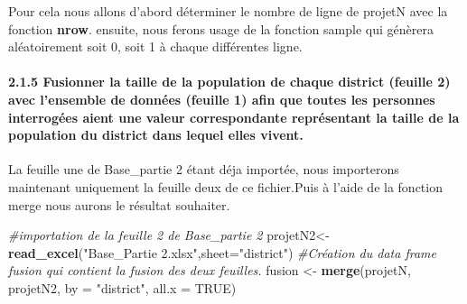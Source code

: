 \documentclass[
]{article}
\newenvironment{Shaded}{\begin{snugshade}}{\end{snugshade}}
\newcommand{\AttributeTok}[1]{\textcolor[rgb]{0.13,0.29,0.53}{#1}}
\newcommand{\CommentTok}[1]{\textcolor[rgb]{0.56,0.35,0.01}{\textit{#1}}}
\newcommand{\ConstantTok}[1]{\textcolor[rgb]{0.56,0.35,0.01}{#1}}
\newcommand{\DecValTok}[1]{\textcolor[rgb]{0.00,0.00,0.81}{#1}}
\newcommand{\FunctionTok}[1]{\textcolor[rgb]{0.13,0.29,0.53}{\textbf{#1}}}
\newcommand{\NormalTok}[1]{#1}
\newcommand{\OtherTok}[1]{\textcolor[rgb]{0.56,0.35,0.01}{#1}}
\newcommand{\SpecialCharTok}[1]{\textcolor[rgb]{0.81,0.36,0.00}{\textbf{#1}}}
\newcommand{\StringTok}[1]{\textcolor[rgb]{0.31,0.60,0.02}{#1}}
\begin{document}
Pour cela nous allons d'abord déterminer le nombre de ligne de projetN
avec la fonction \textbf{nrow}. ensuite, nous ferons usage de la
fonction sample qui génèrera aléatoirement soit 0, soit 1 à chaque
différentes ligne.

\begin{Shaded}
\end{Shaded}

\hypertarget{fusionner-la-taille-de-la-population-de-chaque-district-feuille-2-avec-lensemble-de-donnuxe9es-feuille-1-afin-que-toutes-les-personnes-interroguxe9es-aient-une-valeur-correspondante-repruxe9sentant-la-taille-de-la-population-du-district-dans-lequel-elles-vivent.}{%
\paragraph{2.1.5 Fusionner la taille de la population de chaque district
(feuille 2) avec l'ensemble de données (feuille 1) afin que toutes les
personnes interrogées aient une valeur correspondante représentant la
taille de la population du district dans lequel elles
vivent.}\label{fusionner-la-taille-de-la-population-de-chaque-district-feuille-2-avec-lensemble-de-donnuxe9es-feuille-1-afin-que-toutes-les-personnes-interroguxe9es-aient-une-valeur-correspondante-repruxe9sentant-la-taille-de-la-population-du-district-dans-lequel-elles-vivent.}}

La feuille une de Base\_partie 2 étant déja importée, nous importerons
maintenant uniquement la feuille deux de ce fichier.Puis à l'aide de la
fonction merge nous aurons le résultat souhaiter.

\begin{Shaded}
\begin{Highlighting}[]
\CommentTok{\#importation de la feuille 2 de Base\_partie 2}
\NormalTok{projetN2}\OtherTok{\textless{}{-}} \FunctionTok{read\_excel}\NormalTok{(}\StringTok{"Base\_Partie 2.xlsx"}\NormalTok{,}\AttributeTok{sheet=}\StringTok{"district"}\NormalTok{)}
\CommentTok{\#Création du data frame fusion qui contient la fusion des deux feuilles.}
\NormalTok{fusion }\OtherTok{\textless{}{-}} \FunctionTok{merge}\NormalTok{(projetN, projetN2, }\AttributeTok{by =} \StringTok{"district"}\NormalTok{, }\AttributeTok{all.x =} \ConstantTok{TRUE}\NormalTok{)}
\end{Highlighting}
\end{Shaded}
\end{document}
